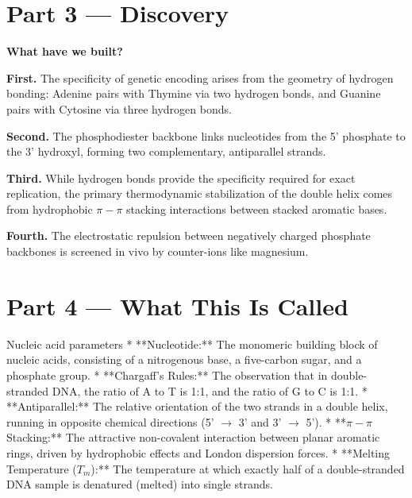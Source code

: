 \documentclass[12pt, a4paper]{book}
\begin{document}
\newpage

\section{Part 3 --- Discovery}

\begin{discoverybox}
\textbf{What have we built?}

\textbf{First.} The specificity of genetic encoding arises from the geometry of hydrogen bonding: Adenine pairs with Thymine via two hydrogen bonds, and Guanine pairs with Cytosine via three hydrogen bonds.

\textbf{Second.} The phosphodiester backbone links nucleotides from the 5' phosphate to the 3' hydroxyl, forming two complementary, antiparallel strands.

\textbf{Third.} While hydrogen bonds provide the specificity required for exact replication, the primary thermodynamic stabilization of the double helix comes from hydrophobic $\pi-\pi$ stacking interactions between stacked aromatic bases.

\textbf{Fourth.} The electrostatic repulsion between negatively charged phosphate backbones is screened in vivo by counter-ions like magnesium.
\end{discoverybox}

\newpage

\section{Part 4 --- What This Is Called}

\begin{namedconcept}{Nucleic acid parameters}
* **Nucleotide:** The monomeric building block of nucleic acids, consisting of a nitrogenous base, a five-carbon sugar, and a phosphate group.
* **Chargaff's Rules:** The observation that in double-stranded DNA, the ratio of A to T is 1:1, and the ratio of G to C is 1:1.
* **Antiparallel:** The relative orientation of the two strands in a double helix, running in opposite chemical directions (5' $\to$ 3' and 3' $\to$ 5').
* **$\pi-\pi$ Stacking:** The attractive non-covalent interaction between planar aromatic rings, driven by hydrophobic effects and London dispersion forces.
* **Melting Temperature ($T_m$):** The temperature at which exactly half of a double-stranded DNA sample is denatured (melted) into single strands.
\end{namedconcept}
\end{document}
